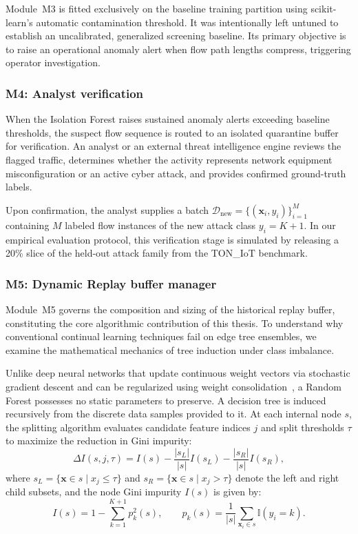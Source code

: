 Module~M3 is fitted exclusively on the baseline training partition using scikit-learn's automatic contamination threshold. It was intentionally left untuned to establish an uncalibrated, generalized screening baseline. Its primary objective is to raise an operational anomaly alert when flow path lengths compress, triggering operator investigation.

\subsubsection{M4: Analyst verification}
\label{subsubsec:m4_analyst_verification}
When the Isolation Forest raises sustained anomaly alerts exceeding baseline thresholds, the suspect flow sequence is routed to an isolated quarantine buffer for verification. An analyst or an external threat intelligence engine reviews the flagged traffic, determines whether the activity represents network equipment misconfiguration or an active cyber attack, and provides confirmed ground-truth labels. 

Upon confirmation, the analyst supplies a batch $\mathcal{D}_{\text{new}} = \{(\mathbf{x}_i, y_i)\}_{i=1}^{M}$ containing $M$ labeled flow instances of the new attack class $y_i = K+1$. In our empirical evaluation protocol, this verification stage is simulated by releasing a 20\% slice of the held-out attack family from the TON\_IoT benchmark.

\subsubsection{M5: Dynamic Replay buffer manager}
\label{subsubsec:m5_dynamic_replay}
Module~M5 governs the composition and sizing of the historical replay buffer, constituting the core algorithmic contribution of this thesis. To understand why conventional continual learning techniques fail on edge tree ensembles, we examine the mathematical mechanics of tree induction under class imbalance.

Unlike deep neural networks that update continuous weight vectors via stochastic gradient descent and can be regularized using weight consolidation~\cite{kirkpatrick2017overcoming}, a Random Forest possesses no static parameters to preserve. A decision tree is induced recursively from the discrete data samples provided to it. At each internal node $s$, the splitting algorithm evaluates candidate feature indices $j$ and split thresholds $\tau$ to maximize the reduction in Gini impurity:
\begin{equation}
\Delta I(s, j, \tau) = I(s) - \frac{|s_L|}{|s|} I(s_L) - \frac{|s_R|}{|s|} I(s_R),
\label{eq:gini_reduction}
\end{equation}
where $s_L = \{\mathbf{x} \in s \mid x_j \le \tau\}$ and $s_R = \{\mathbf{x} \in s \mid x_j > \tau\}$ denote the left and right child subsets, and the node Gini impurity $I(s)$ is given by:
\begin{equation}
I(s) = 1 - \sum_{k=1}^{K+1} p_k^2(s), \qquad p_k(s) = \frac{1}{|s|} \sum_{\mathbf{x}_i \in s} \mathbb{I}(y_i = k).
\label{eq:gini_impurity}
\end{equation}

